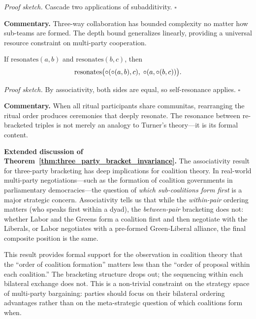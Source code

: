 \noindent\textit{Proof sketch.}\quad
Cascade two applications of subadditivity.
\hfill$\square$

\medskip

\noindent\textbf{Commentary.}
Three-way collaboration has bounded complexity no matter how sub-teams are
formed.  The depth bound generalizes linearly, providing a universal
resource constraint on multi-party cooperation.

\begin{theorem}
\label{thm:triple_reorder_resonance}
If $\text{resonates}(a, b)$ and $\text{resonates}(b, c)$, then
\[
  \text{resonates}\bigl(\circ(\circ(a,b), c),\;
  \circ(a, \circ(b,c))\bigr).
\]
\end{theorem}

\noindent\textit{Proof sketch.}\quad
By associativity, both sides are equal, so self-resonance applies.
\hfill$\square$

\medskip

\noindent\textbf{Commentary.}
When all ritual participants share communitas, rearranging the ritual order
produces ceremonies that deeply resonate.  The resonance between re-bracketed
triples is not merely an analogy to Turner's theory---it is its formal
content.


\noindent\textbf{Extended discussion of Theorem~\ref{thm:three_party_bracket_invariance}.}\quad
The associativity result for three-party bracketing has deep implications
for coalition theory.  In real-world multi-party negotiations---such as
the formation of coalition governments in parliamentary democracies---the
question of \emph{which sub-coalitions form first} is a major strategic
concern.  Associativity tells us that while the \emph{within-pair} ordering
matters (who speaks first within a dyad), the \emph{between-pair} bracketing
does not: whether Labor and the Greens form a coalition first and then
negotiate with the Liberals, or Labor negotiates with a pre-formed
Green-Liberal alliance, the final composite position is the same.

This result provides formal support for the observation in coalition theory
that the ``order of coalition formation'' matters less than the ``order of
proposal within each coalition.''  The bracketing structure drops out;
the sequencing within each bilateral exchange does not.  This is a
non-trivial constraint on the strategy space of multi-party bargaining:
parties should focus on their bilateral ordering advantages rather than
on the meta-strategic question of which coalitions form when.

